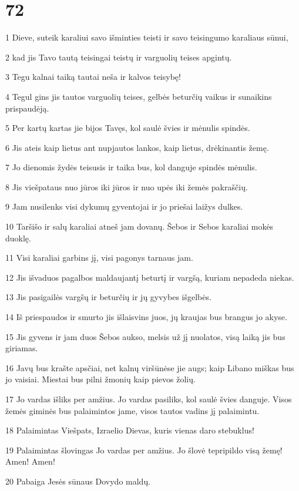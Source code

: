 \chapter{72}


\par 1 Dieve, suteik karaliui savo išminties teisti ir savo teisingumo karaliaus sūnui, 
\par 2 kad jis Tavo tautą teisingai teistų ir varguolių teises apgintų. 
\par 3 Tegu kalnai taiką tautai neša ir kalvos teisybę! 
\par 4 Tegul gins jis tautos varguolių teises, gelbės beturčių vaikus ir sunaikins prispaudėją. 
\par 5 Per kartų kartas jie bijos Tavęs, kol saulė švies ir mėnulis spindės. 
\par 6 Jis ateis kaip lietus ant nupjautos lankos, kaip lietus, drėkinantis žemę. 
\par 7 Jo dienomis žydės teisusis ir taika bus, kol danguje spindės mėnulis. 
\par 8 Jis viešpataus nuo jūros iki jūros ir nuo upės iki žemės pakraščių. 
\par 9 Jam nusilenks visi dykumų gyventojai ir jo priešai laižys dulkes. 
\par 10 Taršišo ir salų karaliai atneš jam dovanų. Šebos ir Sebos karaliai mokės duoklę. 
\par 11 Visi karaliai garbins jį, visi pagonys tarnaus jam. 
\par 12 Jis išvaduos pagalbos maldaujantį beturtį ir vargšą, kuriam nepadeda niekas. 
\par 13 Jis pasigailės vargšų ir beturčių ir jų gyvybes išgelbės. 
\par 14 Iš priespaudos ir smurto jis išlaisvins juos, jų kraujas bus brangus jo akyse. 
\par 15 Jis gyvens ir jam duos Šebos aukso, melsis už jį nuolatos, visą laiką jis bus giriamas. 
\par 16 Javų bus krašte apsčiai, net kalnų viršūnėse jie augs; kaip Libano miškas bus jo vaisiai. Miestai bus pilni žmonių kaip pievos žolių. 
\par 17 Jo vardas išliks per amžius. Jo vardas pasiliks, kol saulė švies danguje. Visos žemės giminės bus palaimintos jame, visos tautos vadins jį palaimintu. 
\par 18 Palaimintas Viešpats, Izraelio Dievas, kuris vienas daro stebuklus! 
\par 19 Palaimintas šlovingas Jo vardas per amžius. Jo šlovė tepripildo visą žemę! Amen! Amen! 
\par 20 Pabaiga Jesės sūnaus Dovydo maldų.


